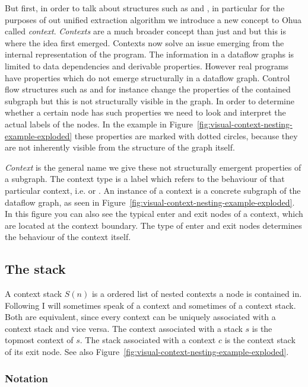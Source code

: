 But first, in order to talk about structures such as \smap{} and \ifop{}, in particular for the purposes of out unified extraction algorithm we introduce a new concept to Ohua called \emph{context}.
\emph{Contexts} are a much broader concept than just \ifop{} and \smap{} but this is where the idea first emerged.
Contexts now solve an issue emerging from the internal representation of the program.
The information in a dataflow graphs is limited to data dependencies and derivable properties.
However real programs have properties which do not emerge structurally in a dataflow graph.
Control flow structures such as \smap{} and \ifop{} for instance change the properties of the contained subgraph but this is not structurally visible in the graph.
In order to determine whether a certain node has such properties we need to look and interpret the actual labels of the nodes.
In the example in Figure~\ref{fig:visual-context-nesting-example-exploded} these properties are marked with dotted circles, because they are not inherently visible from the structure of the graph itself.

\emph{Context} is the general name we give these not structurally emergent properties of a subgraph.
The context type is a label which refers to the behaviour of that particular context, i.e. \ifop{} or \smap{}.
An instance of a context is a concrete subgraph of the dataflow graph, as seen in Figure~\ref{fig:visual-context-nesting-example-exploded}.
In this figure you can also see the typical enter and exit nodes of a context, which are located at the context boundary.
The type of enter and exit nodes determines the behaviour of the context itself.

\subsection{The stack}

A context stack $S(n)$ is a ordered list of nested contexts a node is contained in.
Following I will sometimes speak of a context and sometimes of a context stack.
Both are equivalent, since every context can be uniquely associated with a context stack and vice versa.
The context associated with a stack $s$ is the topmost context of $s$.
The stack associated with a context $c$ is the context stack of its exit node.
See also Figure~\ref{fig:visual-context-nesting-example-exploded}.

\subsubsection{Notation}

